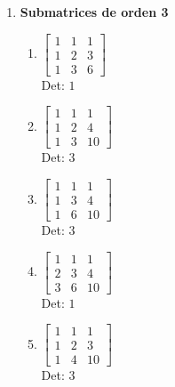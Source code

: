 \documentclass[12pt]{article}
\begin{document}
\begin{enumerate}
\begin{enumerate}
\item {\bf Submatrices de orden 3}\\

\begin{enumerate}


\item $\displaystyle \left[\begin{matrix}1 & 1 & 1\\1 & 2 & 3\\1 & 3 & 6\end{matrix}\right]$\\

Det: $1$\\


\item $\displaystyle \left[\begin{matrix}1 & 1 & 1\\1 & 2 & 4\\1 & 3 & 10\end{matrix}\right]$\\

Det: $3$\\


\item $\displaystyle \left[\begin{matrix}1 & 1 & 1\\1 & 3 & 4\\1 & 6 & 10\end{matrix}\right]$\\

Det: $3$\\


\item $\displaystyle \left[\begin{matrix}1 & 1 & 1\\2 & 3 & 4\\3 & 6 & 10\end{matrix}\right]$\\

Det: $1$\\


\item $\displaystyle \left[\begin{matrix}1 & 1 & 1\\1 & 2 & 3\\1 & 4 & 10\end{matrix}\right]$\\

Det: $3$\\



\end{enumerate}
\end{enumerate}
\end{enumerate}
\end{document}
